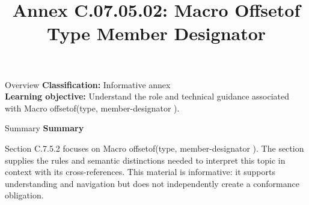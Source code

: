 \documentclass[10pt,letterpaper]{article}
\title{Annex C.07.05.02: Macro Offsetof Type Member Designator}
\author{}
\date{}
\begin{document}
\maketitle
\begin{CornellOverviewBox}{Overview}
\textbf{Classification:} Informative annex\\[2pt]
\textbf{Learning objective:} Understand the role and technical guidance associated with Macro offsetof(type, member-designator ).
\end{CornellOverviewBox}\begin{CornellSummaryBox}{Summary}
{\sffamily\bfseries\color{Accent} Summary}\par\vspace{3pt}Section C.7.5.2 focuses on Macro offsetof(type, member-designator ). The section supplies the rules and semantic distinctions needed to interpret this topic in context with its cross-references. This material is informative: it supports understanding and navigation but does not independently create a conformance obligation.
\end{CornellSummaryBox}
\end{document}
